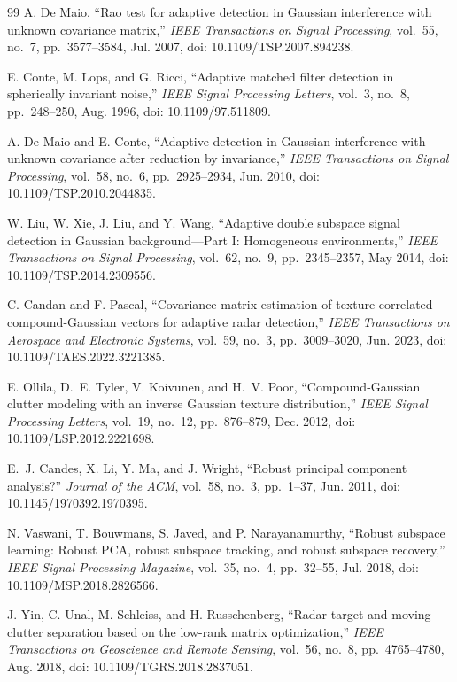 \documentclass[journal]{IEEEtran}
\begin{document}
\begin{thebibliography}{99}
A. De Maio, ``Rao test for adaptive detection in Gaussian interference with unknown covariance matrix,'' \emph{IEEE Transactions on Signal Processing}, vol.~55, no.~7, pp.~3577--3584, Jul. 2007, doi: 10.1109/TSP.2007.894238.

E. Conte, M. Lops, and G. Ricci, ``Adaptive matched filter detection in spherically invariant noise,'' \emph{IEEE Signal Processing Letters}, vol.~3, no.~8, pp.~248--250, Aug. 1996, doi: 10.1109/97.511809.

A. De Maio and E. Conte, ``Adaptive detection in Gaussian interference with unknown covariance after reduction by invariance,'' \emph{IEEE Transactions on Signal Processing}, vol.~58, no.~6, pp.~2925--2934, Jun. 2010, doi: 10.1109/TSP.2010.2044835.

W. Liu, W. Xie, J. Liu, and Y. Wang, ``Adaptive double subspace signal detection in Gaussian background---Part I: Homogeneous environments,'' \emph{IEEE Transactions on Signal Processing}, vol.~62, no.~9, pp.~2345--2357, May 2014, doi: 10.1109/TSP.2014.2309556.

C. Candan and F. Pascal, ``Covariance matrix estimation of texture correlated compound-Gaussian vectors for adaptive radar detection,'' \emph{IEEE Transactions on Aerospace and Electronic Systems}, vol.~59, no.~3, pp.~3009--3020, Jun. 2023, doi: 10.1109/TAES.2022.3221385.

E. Ollila, D.~E. Tyler, V. Koivunen, and H.~V. Poor, ``Compound-Gaussian clutter modeling with an inverse Gaussian texture distribution,'' \emph{IEEE Signal Processing Letters}, vol.~19, no.~12, pp.~876--879, Dec. 2012, doi: 10.1109/LSP.2012.2221698.

E.~J. Candes, X. Li, Y. Ma, and J. Wright, ``Robust principal component analysis?'' \emph{Journal of the ACM}, vol.~58, no.~3, pp.~1--37, Jun. 2011, doi: 10.1145/1970392.1970395.

N. Vaswani, T. Bouwmans, S. Javed, and P. Narayanamurthy, ``Robust subspace learning: Robust PCA, robust subspace tracking, and robust subspace recovery,'' \emph{IEEE Signal Processing Magazine}, vol.~35, no.~4, pp.~32--55, Jul. 2018, doi: 10.1109/MSP.2018.2826566.

J. Yin, C. Unal, M. Schleiss, and H. Russchenberg, ``Radar target and moving clutter separation based on the low-rank matrix optimization,'' \emph{IEEE Transactions on Geoscience and Remote Sensing}, vol.~56, no.~8, pp.~4765--4780, Aug. 2018, doi: 10.1109/TGRS.2018.2837051.


\end{thebibliography}
\end{document}
